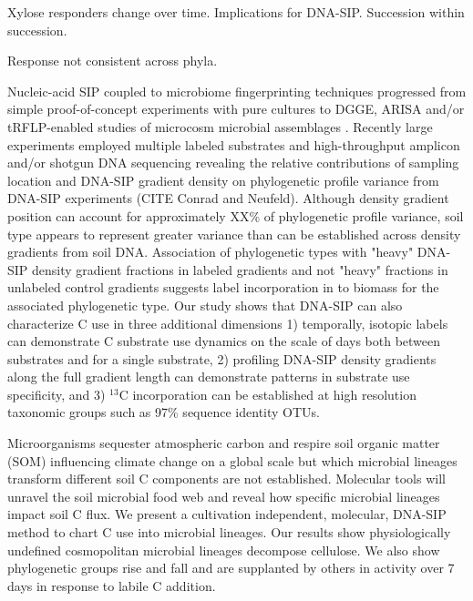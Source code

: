 Xylose responders change over time. Implications for DNA-SIP. Succession within
succession.

Response not consistent across phyla.

Nucleic-acid SIP coupled to microbiome fingerprinting techniques progressed
from simple proof-of-concept experiments with pure cultures
\citep{radajewski2000stable} to DGGE, ARISA and/or tRFLP-enabled studies of
microcosm microbial assemblages \citep{Haichar_2007}. Recently large
experiments employed multiple labeled substrates and high-throughput amplicon
and/or shotgun DNA sequencing \citep{Verastegui_2014} revealing the relative
contributions of sampling location and DNA-SIP gradient density on phylogenetic
profile variance from DNA-SIP experiments (CITE Conrad and Neufeld). Although
density gradient position can account for approximately XX\% of phylogenetic
profile variance, soil type appears to represent greater variance than can be
established across density gradients from soil DNA. Association of phylogenetic
types with "heavy" DNA-SIP density gradient fractions in labeled gradients and
not "heavy" fractions in unlabeled control gradients suggests label
incorporation in to biomass for the associated phylogenetic type. Our study
shows that DNA-SIP can also characterize C use in three additional 
dimensions 1) temporally, isotopic labels can demonstrate C substrate use
dynamics on the scale of days both between substrates and for a single
substrate, 2) profiling DNA-SIP density gradients along the full gradient
length can demonstrate patterns in substrate use specificity, and 3) $^{13}$C
incorporation can be established at high resolution taxonomic groups such
as 97\% sequence identity OTUs.

Microorganisms sequester atmospheric carbon and respire soil organic matter
(SOM) influencing climate change on a global scale but which microbial lineages
transform different soil C components are not established. Molecular tools will
unravel the soil microbial food web and reveal how specific microbial lineages
impact soil C flux. We present a cultivation independent, molecular, DNA-SIP
method to chart C use into microbial lineages. Our results show physiologically
undefined cosmopolitan microbial lineages decompose cellulose. We also show
phylogenetic groups rise and fall and are supplanted by others in activity over
7 days in response to labile C addition.  


